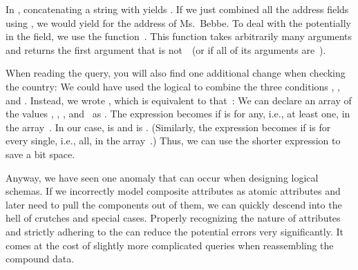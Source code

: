 In \postgresql, concatenating a string with  yields .
If we just combined all the address fields using \sqlil{||}\sqlIdx{\textbar\textbar}, we would yield  for the address of Ms.~Bebbe.
To deal with the potentially  in the  field, we use the  function~\cite{PGDG:PD:CE}.
This function takes arbitrarily many arguments and returns the first argument that is not~~(or  if all of its arguments are~).%
%
\begin{sloppypar}%
When reading the query, you will also find one additional change when checking the country:
We could have used the logical  to combine the three conditions , , and .
Instead, we wrote , which is equivalent to that~\cite{PGDG:PD:RAAC,PGDG:PD:A}:
We can declare an array of the values , , , and~ as .
The expression  becomes  if  is  for any, i.e., at least one,  in the array~\cite{PGDG:PD:RAAC}.
In our case,  is  and  is .
(Similarly, the expression  becomes  if  is  for every single, i.e., all,  in the array~\cite{PGDG:PD:RAAC}.)
Thus, we can use the shorter expression to save a bit space.%
\end{sloppypar}%
%
Anyway, we have seen one anomaly that can occur when designing logical schemas.
If we incorrectly model composite attributes as atomic attributes and later need to pull the components out of them, we can quickly descend into the hell of crutches and special cases.
Properly recognizing the nature of attributes and strictly adhering to the  can reduce the potential errors very significantly.
It comes at the cost of slightly more complicated queries when reassembling the compound data.%
%
\FloatBarrier%
\endhsection%
\endhsection%
%
